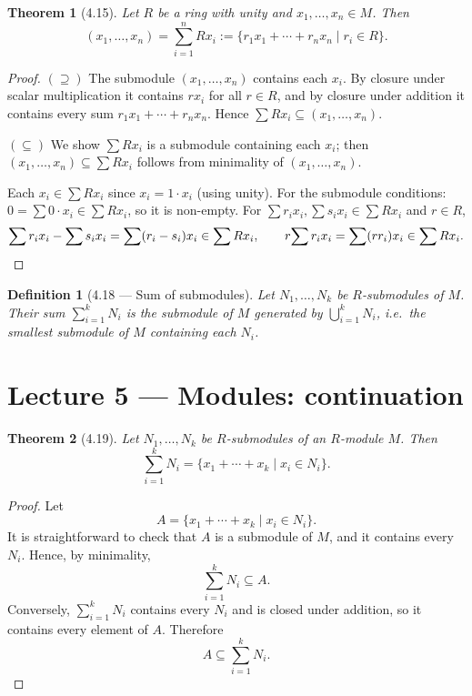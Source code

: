 \documentclass[12pt]{article}
\newtheorem{theorem}{Theorem}
\newtheorem{definition}{Definition}
\begin{document}
\begin{theorem}[4.15]
Let $R$ be a ring with unity and $x_1, \ldots, x_n \in M$. Then
\[
  (x_1, \ldots, x_n) = \sum_{i=1}^n Rx_i := \{r_1x_1 + \cdots + r_nx_n \mid r_i \in R\}.
\]
\end{theorem}

\begin{proof}
$(\supseteq)$ The submodule $(x_1,\ldots,x_n)$ contains each $x_i$. By closure under scalar multiplication it contains $rx_i$ for all $r \in R$, and by closure under addition it contains every sum $r_1x_1 + \cdots + r_nx_n$. Hence $\sum Rx_i \subseteq (x_1,\ldots,x_n)$.

$(\subseteq)$ We show $\sum Rx_i$ is a submodule containing each $x_i$; then $(x_1,\ldots,x_n) \subseteq \sum Rx_i$ follows from minimality of $(x_1,\ldots,x_n)$.

Each $x_i \in \sum Rx_i$ since $x_i = 1 \cdot x_i$ (using unity). For the submodule conditions: $0 = \sum 0 \cdot x_i \in \sum Rx_i$, so it is non-empty. For $\sum r_ix_i, \sum s_ix_i \in \sum Rx_i$ and $r \in R$,
\[
  \sum r_ix_i - \sum s_ix_i = \sum(r_i - s_i)x_i \in \sum Rx_i, \qquad r\!\sum r_ix_i = \sum(rr_i)x_i \in \sum Rx_i. \qedhere
\]
\end{proof}


\begin{definition}[4.18 — Sum of submodules]
Let $N_1, \ldots, N_k$ be $R$-submodules of $M$. Their \emph{sum} $\sum_{i=1}^k N_i$ is the submodule of $M$ generated by $\bigcup_{i=1}^k N_i$, i.e.\ the smallest submodule of $M$ containing each $N_i$.
\end{definition}

\section*{Lecture 5 — Modules: continuation}

\begin{theorem}[4.19]

Let $N_1,\ldots,N_k$ be $R$-submodules of an $R$-module $M$. Then
\[
\sum_{i=1}^k N_i
=
\{x_1+\cdots+x_k \mid x_i\in N_i\}.
\]

\end{theorem}

\begin{proof}

Let
\[
A=\{x_1+\cdots+x_k\mid x_i\in N_i\}.
\]
It is straightforward to check that $A$ is a submodule of $M$, and it contains every $N_i$. Hence, by minimality,
\[
\sum_{i=1}^k N_i\subseteq A.
\]
Conversely, $\sum_{i=1}^k N_i$ contains every $N_i$ and is closed under addition, so it contains every element of $A$. Therefore
\[
A\subseteq \sum_{i=1}^k N_i.
\]

\end{proof}
\end{document}
